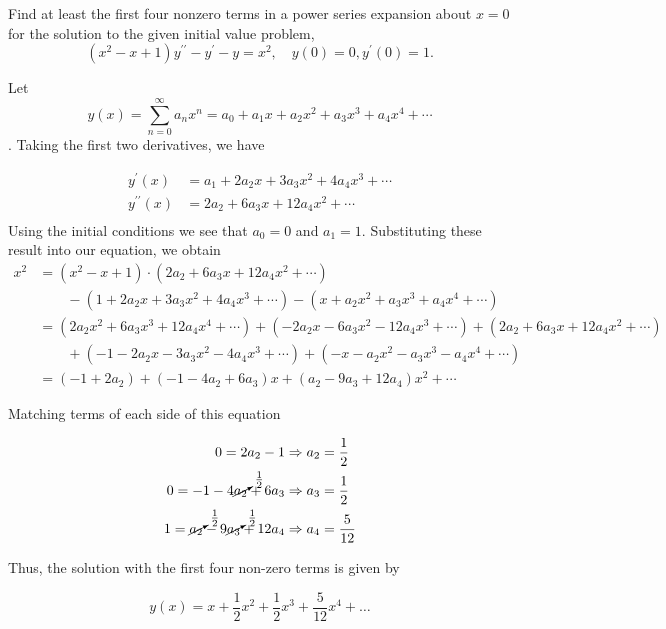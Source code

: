 \documentclass[11pt]{article}
\begin{document}
\begin{problem}
Find at least the first four nonzero terms in a power series expansion about $x=0$ for the solution to the given initial value problem,
\begin{equation*}
(x^2-x+1)y^{\prime \prime} - y^{\prime} -y=x^{2},\quad y(0)=0, y^{\prime}(0)=1.
\end{equation*}
\end{problem}
\begin{solution}
\indent Let $$y(x)= \displaystyle \sum_{n=0}^{\infty} a_{n} x^n = a_{0} + a_{1}x +a_{2}x^{2}+a_{3}x^{3} + a_{4}x^{4} + \cdots $$. Taking the first two derivatives, we have

\begin{align*}
y^{\prime}(x) & = a_{1} + 2 a_{2}x+ 3a_{3}x^{2} + 4a_{4}x^{3} + \cdots \\
y^{\prime \prime}(x) & = 2a_{2} + 6a_{3}x + 12a_{4}x^{2} + \cdots\\
\end{align*}
Using the initial conditions we see that $a_{0}=0$ and $a_{1}=1$.
Substituting these result into our equation, we obtain
\begin{align*}
x^{2} & =  (x^2-x+1) \cdot (2a_{2} + 6a_{3}x + 12a_{4}x^{2} + \cdots) \\
& \qquad - (1 + 2 a_{2}x+ 3a_{3}x^{2} + 4a_{4}x^{3} + \cdots) - (x +a_{2}x^{2}+a_{3}x^{3} + a_{4}x^{4} + \cdots) \\
& = (2a_{2}x^{2} + 6a_{3}x^{3} + 12a_{4}x^{4} + \cdots) + (- 2a_{2}x - 6a_{3}x^{2} - 12a_{4}x^{3} + \cdots) + (2a_{2} + 6a_{3}x + 12a_{4}x^{2} + \cdots) \\
& \qquad + ( -1 - 2 a_{2}x- 3a_{3}x^{2} - 4a_{4}x^{3} + \cdots) + (-x -a_{2}x^{2}-a_{3}x^{3} - a_{4}x^{4} + \cdots) \\
& = (-1 + 2a_{2})+ (-1-4a_{2}+6a_{3})x + (a_{2}-9a_{3}+12a_{4})x^{2}+\cdots 
\end{align*}

Matching terms of each side of this equation



\begin{align*}
0 = 2a_{2}-1  & \Rightarrow a_{2} = \frac{1}{2} \\
0 = -1-4\cancelto{\frac{1}{2}}{a_{2}}+6a_{3}  & \Rightarrow a_{3} = \frac{1}{2} \\
1 = \cancelto{\frac{1}{2}}{a_{2}}-9\cancelto{\frac{1}{2}}{a_{3}}+12a_{4}  & \Rightarrow a_{4} = \frac{5}{12}
\end{align*}

Thus, the solution with the first four non-zero terms is given by

\begin{equation*}
\boxed{y(x) = x +\dfrac{1}{2}x^2+\dfrac{1}{2}x^3 + \dfrac{5}{12}x^4 + \ldots}
\end{equation*}
\end{solution}
\end{document}

